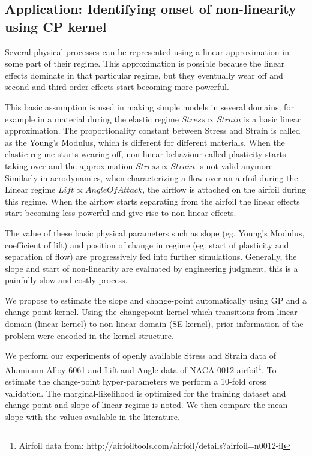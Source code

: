 \subsection{Application: Identifying onset of non-linearity  using CP kernel}\label{subsubsecCh4ApplicationCP}
Several physical processes can be represented using a linear approximation in some part of their regime. This approximation is possible because the linear effects dominate in that particular regime, but they eventually wear off and second and third order effects start becoming more powerful. 

This basic assumption is used in making simple models in several domains; for example in a material during the elastic regime $Stress \propto Strain$ is a basic linear approximation. The proportionality constant between Stress and Strain is called as the Young's Modulus, which is different for different materials. When the elastic regime starts wearing off, non-linear behaviour called plasticity starts taking over and the approximation $Stress \propto Strain$ is not valid anymore. Similarly in aerodynamics, when characterizing a flow over an airfoil during the Linear regime  $ Lift \propto Angle Of Attack$, the airflow is attached on the airfoil during this regime. When the airflow starts separating from the airfoil the linear effects start becoming less powerful and give rise to non-linear effects. 

The value of these basic physical parameters such as slope (eg. Young's Modulus, coefficient of lift) and position of change in regime (eg. start of plasticity and separation of flow) are progressively fed into further simulations. Generally, the slope and start of non-linearity are evaluated by engineering judgment, this is a painfully slow and costly process. 

We propose to estimate the slope and change-point automatically using GP and a change point kernel. Using the changepoint kernel which transitions from linear domain (linear kernel) to non-linear domain (SE kernel), prior information of the problem were encoded in the kernel structure. 

We perform our experiments of openly available Stress and Strain data of Aluminum Alloy 6061 \cite{kaufman1999properties} and Lift and Angle data of NACA 0012 airfoil\footnote{Airfoil data from: http://airfoiltools.com/airfoil/details?airfoil=n0012-il}. To estimate the change-point hyper-parameters we perform a 10-fold cross validation. The marginal-likelihood is optimized for the training dataset and change-point and slope of linear regime is noted. We then compare the mean slope with the values available in the literature. 

